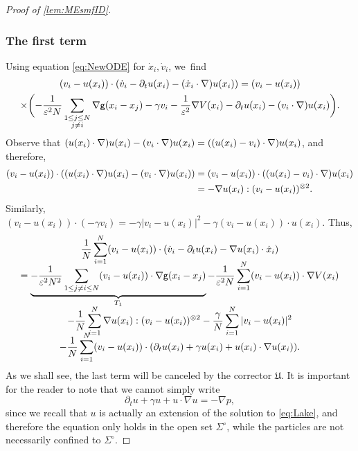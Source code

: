 \documentclass[10pt]{amsart}
\newcommand{\Sigmacirc}{\Sigma^\circ}
\theoremstyle{plain}
\theoremstyle{definition}
\DeclarePairedDelimiter{\pa}{\lparen}{\rparen}
\let\ga\gamma
\let\vep\varepsilon
\let\nab\nabla
\let\p\partial
\newcommand{\Uu}{\mathfrak{U}}
\newcommand{\g}{{\mathsf{g}}}
\begin{document}
\begin{proof}[Proof of \cref{lem:MEsmfID}]
\subsubsection*{The first term} Using equation \eqref{eq:NewODE} for $\dot{x}_i, \dot{v}_i$, we~find\vspace*{-5pt}
\begin{multline*}
(v_i - u(x_i))\cdot (\dot{v}_i - \p_t u(x_i) - (\dot{x}_i\cdot\nabla)u(x_i)) = \pa*{v_i- u(x_i)}\\
\times\biggl(-\frac{1}{\vep^2 N}\sum_{\substack{1\leq j\leq N \\ j\neq i}}\nabla\g(x_i-x_j)
-\ga v_i- \frac{1}{\vep^2}\nabla V(x_i) -\p_t u(x_i) - (v_i\cdot\nabla) u(x_i)\biggr).
\end{multline*}
Observe that $(u(x_i)\cdot\nabla)u(x_i) - (v_i\cdot\nabla) u(x_i) = \pa*{(u(x_i)-v_i)\cdot\nabla}u(x_i)$,
and therefore,
\begin{align*}
(v_i-u(x_i)) \cdot \pa*{(u(x_i)\cdot\nabla)u(x_i) - (v_i\cdot\nabla) u(x_i)} &= (v_i-u(x_i)) \cdot\pa*{(u(x_i)-v_i)\cdot\nabla}u(x_i)\\
&= - \nab u(x_i) : (v_i-u(x_i))^{\otimes 2}.
\end{align*}
Similarly, $(v_i-u(x_i))\cdot (-\ga v_i) = -\ga |v_i-u(x_i)|^2 - \ga (v_i-u(x_i))\cdot u(x_i)$.
Thus,\vspace*{-5pt}
\begin{multline}\label{eq:dtkecon}
\frac{1}{N}\sum_{i=1}^N \pa*{v_i - u(x_i)}\cdot \pa*{\dot{v}_i - \p_t u(x_i) - \nabla u(x_i)\cdot \dot{x}_i} \\[-8pt]
= \underbrace{-\frac{1}{\vep^2 N^2}\sum_{1\leq j\neq i\leq N}\pa*{v_i - u(x_i)}\cdot \nabla\g(x_i-x_j)}_{T_1} {-\frac{1}{\vep^2 N}\sum_{i=1}^N \pa*{v_i - u(x_i)}\cdot\nabla V(x_i)}\\[-5pt]
- \frac{1}{N}\sum_{i=1}^N \nab u(x_i): (v_i-u(x_i))^{\otimes2} -\frac{\ga}{N}\sum_{i=1}^N |v_i-u(x_i)|^2 \\[-8pt]
{- \frac{1}{N}\sum_{i=1}^N \pa*{v_i - u(x_i)}\cdot\pa*{\p_t u(x_i) + \ga u(x_i) + u(x_i)\cdot\nabla u(x_i)}}.
\end{multline}
As we shall see, the last term will be canceled by the corrector $\Uu$. It is important for the reader to note that we cannot simply write\vspace*{-3pt}
\begin{equation*}
\p_t u +\ga u + u\cdot\nabla u = -\nabla p,
\end{equation*}
since we recall that $u$ is actually an extension of the solution to \eqref{eq:Lake}, and therefore the equation only holds in the open set $\Sigmacirc$, while the particles are not necessarily confined to $\Sigmacirc$.


\end{proof}
\end{document}
